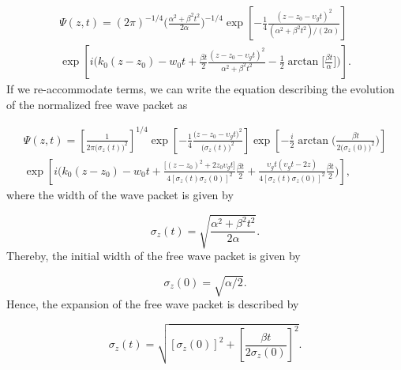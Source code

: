 \documentclass{article}
\begin{document}
\begin{multline}\label{free_wave_packet_position_space_centered_0} 
    \Psi (z, t) = (2\pi)^{-1/4} \bigg(\frac{\alpha^{2} + \beta^{2} t^{2}}{2\alpha}\bigg)^{-1/4} \exp \left[-\frac{1}{4} \frac{ (z - z_{0} - \upsilon_{g} t)^{2}}{(\alpha^{2} + \beta^{2}t^{2})/(2\alpha)}  \right] \\ \exp \left[i \bigg(k_{0}(z-z_{0}) - w_{0}t + \frac{\beta t}{2}\frac{(z - z_{0} - \upsilon_{g} t)^{2}}{\alpha^{2} + \beta^{2}t^{2}} - \frac{1}{2} \arctan\bigg[\frac{\beta t}{\alpha}\bigg]\bigg) \right].
\end{multline}
%
If we re-accommodate terms, we can write the equation describing the evolution of the normalized free wave packet as

\begin{multline}\label{free_wave_packet_position_space_centered_z0_final_form}
    \Psi (z, t) = \left[\frac{1}{2 \pi \big(\sigma_{z}(t)\big)^2} \right]^{1/4} \exp \left[-\frac{1}{4} \frac{ \big(z - z_{0} - \upsilon_{g} t \big)^{2}}{\big(\sigma_{z}(t)\big)^{2}} \right] \exp \left[-\frac{i}{2} \arctan\Bigg(\frac{\beta t }{2\big(\sigma_{z}(0)\big)^{2}}\Bigg) \right] \\ \exp \left[i \bigg(k_{0}(z-z_{0}) - w_{0}t + \frac{\big[(z - z_{0})^{2} + 2 z_{0} \upsilon_{g} t \big]}{ 4[\sigma_{z}(t)\sigma_{z}(0)]^{2}} \frac{\beta t}{2} + \frac{\upsilon_{g} t (\upsilon_{g} t - 2z)}{4[\sigma_{z}(t)\sigma_{z}(0)]^{2}} \frac{\beta t}{2} \bigg) \right],
\end{multline}
%
where the width of the wave packet is given by

\begin{equation}
\sigma_{z}(t) = \sqrt{\frac{\alpha^{2} + \beta^{2}t^{2}}{2 \alpha}}.
\end{equation}
%
Thereby, the initial width of the free wave packet is given by

\begin{equation}
\sigma_{z}(0) = \sqrt{\alpha / 2}.
\end{equation}
%
Hence, the expansion of the free wave packet is described by 

\begin{equation}\label{free_wave_packet_width} 
\sigma_{z}(t) = \sqrt{[\sigma_{z}(0)]^{2} + \left[\frac{\beta t}{2 \sigma_{z}(0)} \right]^{2}}.
\end{equation}
\end{document}
